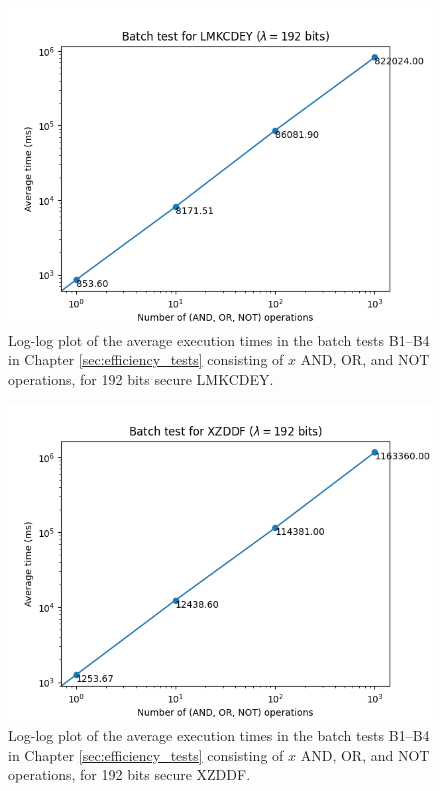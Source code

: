 \begin{figure}[ht]
    \centering
    \includegraphics[width=0.8\linewidth]{data/figures/LMKCDEY_STD192_batch.png}
    \caption{Log-log plot of the average execution times in the batch tests B1--B4 in Chapter \ref{sec:efficiency_tests} consisting of $x$ AND, OR, and NOT operations, for 192 bits secure LMKCDEY.}
    \label{fig:batch_lmkcdey192}
\end{figure}

\begin{figure}[ht]
    \centering
    \includegraphics[width=0.8\linewidth]{data/figures/XZDDF_STD192_batch.png}
    \caption{Log-log plot of the average execution times in the batch tests B1--B4 in Chapter \ref{sec:efficiency_tests} consisting of $x$ AND, OR, and NOT operations, for 192 bits secure XZDDF.}
    \label{fig:batch_xzddf192}
\end{figure}

\fi